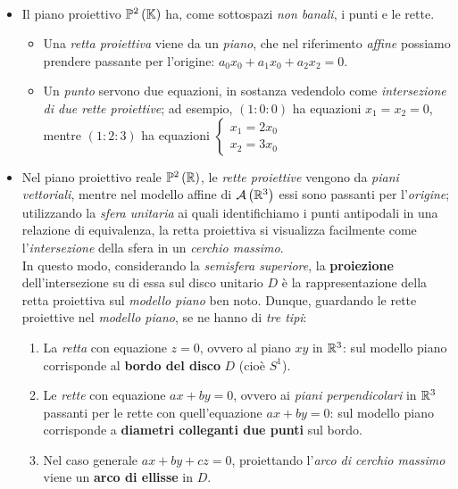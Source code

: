\begin{examples}~{}
	\begin{itemize}
		\item Il piano proiettivo $\proj[2]{\kamp}$ ha, come sottospazi \textit{non banali}, i punti e le rette.
		\begin{itemize}
			\item Una \textit{retta proiettiva} viene da un \textit{piano}, che nel riferimento \textit{affine} possiamo prendere passante per l'origine: $a_0x_0+a_1x_0+a_2x_2=0$.
			\item Un \textit{punto} servono due equazioni, in sostanza vedendolo come \textit{intersezione di due rette proiettive}; ad esempio, $\left(1\colon0\colon0\right)$ ha equazioni $x_1=x_2=0$, mentre $\left(1\colon2\colon3\right)$ ha equazioni $\begin{cases}
				x_1=2x_0\\
				x_2=3x_0
			\end{cases}$
		\end{itemize}
	\item Nel piano proiettivo reale $\proj[2]{\realset}$, le \textit{rette proiettive} vengono da \textit{piani vettoriali}, mentre nel modello affine di ${\mathcal{A}\left(\mathbb{R}^3\right)}$ essi sono passanti per l'\textit{origine}; utilizzando la \textit{sfera unitaria} ai quali identifichiamo i punti antipodali in una relazione di equivalenza, la retta proiettiva si visualizza facilmente come l'\textit{intersezione} della sfera in un \textit{cerchio massimo}.\\
	In questo modo, considerando la \textit{semisfera superiore}, la \textbf{proiezione} dell'intersezione su di essa sul disco unitario $D$ è la rappresentazione della retta proiettiva sul \textit{modello piano} ben noto. Dunque, guardando le rette proiettive nel \textit{modello piano}, se ne hanno di \textit{tre tipi}:
	\begin{enumerate}
		\item La \textit{retta} con equazione $z=0$, ovvero al piano $xy$ in $\mathbb{R}^3$: sul modello piano corrisponde al \textbf{bordo del disco} $D$ (cioè $S^1$).
		\item Le \textit{rette} con equazione $ax+by=0$, ovvero ai \textit{piani perpendicolari} in $\mathbb{R}^3$ passanti per le rette con quell'equazione $ax+by=0$:  sul modello piano corrisponde a \textbf{diametri colleganti due punti} sul bordo.
		\item Nel caso generale $ax+by+cz=0$, proiettando l'\textit{arco di cerchio massimo} viene un \textbf{arco di ellisse} in $D$.

\end{enumerate}
\end{itemize}
\end{examples}

